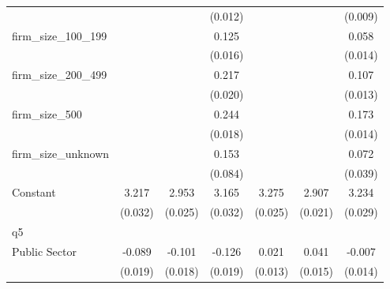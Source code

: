 {\begin{tabular}{l*{6}{c}}
                    &                     &                     &     (0.012)         &                     &                     &     (0.009)         \\
firm\_size\_100\_199   &                     &                     &       0.125\sym{***}&                     &                     &       0.058\sym{***}\\
                    &                     &                     &     (0.016)         &                     &                     &     (0.014)         \\
firm\_size\_200\_499   &                     &                     &       0.217\sym{***}&                     &                     &       0.107\sym{***}\\
                    &                     &                     &     (0.020)         &                     &                     &     (0.013)         \\
firm\_size\_500       &                     &                     &       0.244\sym{***}&                     &                     &       0.173\sym{***}\\
                    &                     &                     &     (0.018)         &                     &                     &     (0.014)         \\
firm\_size\_unknown   &                     &                     &       0.153\sym{*}  &                     &                     &       0.072\sym{*}  \\
                    &                     &                     &     (0.084)         &                     &                     &     (0.039)         \\
Constant            &       3.217\sym{***}&       2.953\sym{***}&       3.165\sym{***}&       3.275\sym{***}&       2.907\sym{***}&       3.234\sym{***}\\
                    &     (0.032)         &     (0.025)         &     (0.032)         &     (0.025)         &     (0.021)         &     (0.029)         \\
\hline
q5                  &                     &                     &                     &                     &                     &                     \\
Public Sector       &      -0.089\sym{***}&      -0.101\sym{***}&      -0.126\sym{***}&       0.021\sym{*}  &       0.041\sym{***}&      -0.007         \\
                    &     (0.019)         &     (0.018)         &     (0.019)         &     (0.013)         &     (0.015)         &     (0.014)         \\

\end{tabular}}
